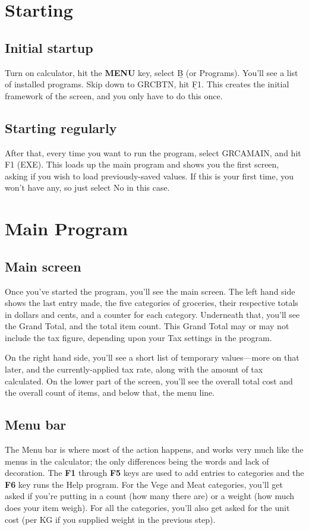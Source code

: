 \documentclass[]{article}
\begin{document}
\section{Starting}
\subsection{Initial startup}
Turn on calculator, hit the {\bf MENU } key, select {\b B } (or Programs). You'll see a list of
installed programs. Skip down to GRCBTN, hit \b F1. This creates the initial framework of the screen,
and you only have to do this once.

\subsection{Starting regularly}
After that, every time you want to run the program, select GRCAMAIN, and hit F1 (EXE).
This loads up the main program and shows you the first screen, asking if you wish to
load previously-saved values. If this is your first time, you won't have any, so just
select No in this case. 


\section{Main Program}
\subsection{Main screen}
Once you've started the program, you'll see the main screen. The left hand side
shows the last entry made, the five categories of groceries, their respective totals
in dollars and cents, and a counter for each category. Underneath that, you'll see the
Grand Total, and the total item count. This Grand Total may or may not include the tax
figure, depending upon your Tax settings in the program.

On the right hand side, you'll see a short list of temporary values---more on that later,
and the currently-applied tax rate, along with the amount of tax calculated. On the lower part of
the screen, you'll see the overall total cost and the overall count of items, and below that, the menu line.
\subsection{Menu bar}
The Menu bar is where most of the action happens, and works very much like the menus
in the calculator; the only differences being the words and lack of decoration.
The {\bf F1} through {\bf F5} keys are used to add entries to categories %
and the  {\bf F6} key runs the Help program. For the Vege and Meat categories,
you'll get asked if you're putting in a count (how many there are) or a weight (how
much does your item weigh). For all the categories, you'll also get asked for the
unit cost (per KG if you supplied weight in the previous step).
\end{document}
